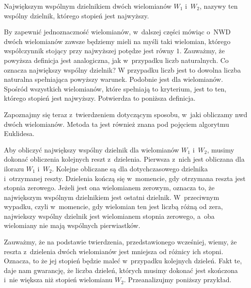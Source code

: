 \begin{definition}
	$ $\\
	Największym wspólnym dzielnikiem dwóch wielomianów $W_1$ i~$W_2$, nazywy ten wspólny dzielnik, którego stopień jest najwyższy.
\end{definition}

By zapewnić jednoznaczność wielomianów, w~dalszej części mówiąc o~NWD dwóch wielomianów zawsze będziemy mieli na myśli taki wielomian, którego współczynnik stojący przy najwyższej potędze jest równy $1$. Zauważmy, że powyższa definicja jest analogiczna, jak w~przypadku liczb naturalnych.
Co oznacza największy wspólny dzielnik? W przypadku liczb jest to dowolna liczba naturalna spełniająca powyższy warunek. Podobnie jest dla wielomianów. Spośród wszystkich wielomianów, które spełniają to kryterium, jest to ten, którego stopień jest najwyższy. Potwierdza to poniższa definicja.

Zapoznajmy się teraz z~twierdzeniem dotyczącym sposobu, w~jaki obliczamy nwd dwóch wielomianów. Metoda ta jest również znana pod pojęciem algorytmu Euklidesa.

\begin{theorem}
	$ $\\
	Aby obliczyć największy wspólny dzielnik dla wielomianów $W_1$ i~$W_2$, musimy dokonać obliczenia kolejnych reszt z~dzielenia. Pierwsza z~nich jest obliczana dla ilorazu $W_1$ i~$W_2$. Kolejne obliczane są dla dotychczasowego dzielnika i~otrzymanej reszty. Dzielenia kończą się w~momencie, gdy otrzymana reszta jest stopnia zerowego. Jeżeli jest ona wielomianem zerowym, oznacza to, że największym wspólnym dzielnikiem jest ostatni dzielnik. W~przeciwnym wypadku, czyli w~momencie, gdy wielomian ten jest liczbą różną od zera, najwiekszy wspólny dzielnik jest wielomianem stopnia zerowego, a~oba wielomiany nie mają wspólnych pierwiastków. 
\end{theorem}

Zauważmy, że na podstawie twierdzenia, przedstawionego wcześniej, wiemy, że reszta z~dzielenia dwóch wielomianów jest mniejsza od różnicy ich stopni. Oznacza, to że jej stopień będzie maleć w~przypadku kolejnych dzieleń. Fakt te, daje nam gwarancję, że liczba dzieleń, których musimy dokonać jest skończona i~nie większa niż stopień wielomianu $W_2$. Przeanalizujmy poniższy przykład.

